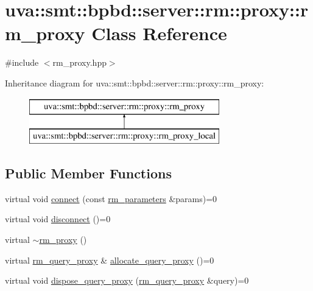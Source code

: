\hypertarget{classuva_1_1smt_1_1bpbd_1_1server_1_1rm_1_1proxy_1_1rm__proxy}{}\section{uva\+:\+:smt\+:\+:bpbd\+:\+:server\+:\+:rm\+:\+:proxy\+:\+:rm\+\_\+proxy Class Reference}
\label{classuva_1_1smt_1_1bpbd_1_1server_1_1rm_1_1proxy_1_1rm__proxy}


{\ttfamily \#include $<$rm\+\_\+proxy.\+hpp$>$}

Inheritance diagram for uva\+:\+:smt\+:\+:bpbd\+:\+:server\+:\+:rm\+:\+:proxy\+:\+:rm\+\_\+proxy\+:\begin{figure}[H]
\begin{center}
\leavevmode
\includegraphics[height=2.000000cm]{classuva_1_1smt_1_1bpbd_1_1server_1_1rm_1_1proxy_1_1rm__proxy}
\end{center}
\end{figure}
\subsection*{Public Member Functions}
\begin{DoxyCompactItemize}
\item 
virtual void \hyperlink{classuva_1_1smt_1_1bpbd_1_1server_1_1rm_1_1proxy_1_1rm__proxy_acbc4f1b6ee8eb90ac1f12683982ecdfb}{connect} (const \hyperlink{structuva_1_1smt_1_1bpbd_1_1server_1_1rm_1_1rm__parameters}{rm\+\_\+parameters} \&params)=0
\item 
virtual void \hyperlink{classuva_1_1smt_1_1bpbd_1_1server_1_1rm_1_1proxy_1_1rm__proxy_a121767bcb9a3b1672b2a7c7b37302037}{disconnect} ()=0
\item 
virtual \hyperlink{classuva_1_1smt_1_1bpbd_1_1server_1_1rm_1_1proxy_1_1rm__proxy_a6faff7aa895e532873a8886fbb3b9808}{$\sim$rm\+\_\+proxy} ()
\item 
virtual \hyperlink{classuva_1_1smt_1_1bpbd_1_1server_1_1rm_1_1proxy_1_1rm__query__proxy}{rm\+\_\+query\+\_\+proxy} \& \hyperlink{classuva_1_1smt_1_1bpbd_1_1server_1_1rm_1_1proxy_1_1rm__proxy_adf3e19602a0092ecd3da07823db7961c}{allocate\+\_\+query\+\_\+proxy} ()=0
\item 
virtual void \hyperlink{classuva_1_1smt_1_1bpbd_1_1server_1_1rm_1_1proxy_1_1rm__proxy_a4f9ad9537cd74044b8f003bc464e1adf}{dispose\+\_\+query\+\_\+proxy} (\hyperlink{classuva_1_1smt_1_1bpbd_1_1server_1_1rm_1_1proxy_1_1rm__query__proxy}{rm\+\_\+query\+\_\+proxy} \&query)=0
\end{DoxyCompactItemize}


